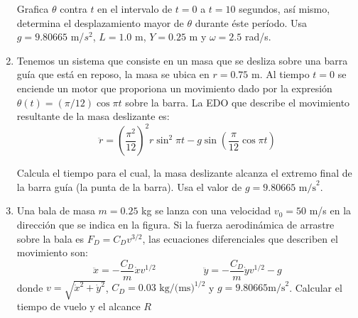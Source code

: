 \documentclass[11pt]{article}
\begin{document}
\begin{enumerate}
\begin{center}
\end{center}
Grafica $\theta$ contra $t$ en el intervalo de $t=0$ a $t=10$ segundos, as\'{i} mismo, determina el desplazamiento mayor de $\theta$ durante \'{e}ste per\'{i}odo. Usa $g=9.80665$ m/$s^{2}$, $L=1.0$ m, $Y=0.25$ m y $\omega = 2.5$ rad/s.
\item Tenemos un sistema que consiste en un masa que se desliza sobre una barra gu\'{i}a que est\'{a} en reposo, la masa se ubica en $r=0.75$ m. Al tiempo $t=0$ se enciende un motor que proporiona un movimiento dado por la expresi\'{o}n $\theta(t) = (\pi/12) \cos \pi t$ sobre la barra. La EDO que describe el movimiento resultante de la masa deslizante es:
\[ \ddot{r} = \left( \dfrac{\pi^{2}}{12}\right)^{2}  r \sin^{2} \pi t - g \sin \left( \dfrac{\pi}{12} \cos \pi t \right) \]
\begin{center}
\end{center}
Calcula el tiempo para el cual, la masa deslizante alcanza el extremo final de la barra gu\'{i}a (la punta de la barra). Usa el valor de $g=9.80665 \mbox{ m/s}^{2}$.
\item Una bala de masa $m=0.25$ kg se lanza con una velocidad $v_{0}= 50$ m/s en la direcci\'{o}n que se indica en la figura. Si la fuerza aerodin\'{a}mica de arrastre sobre la bala es $F_{D}= C_{D} v^{3/2}$, las ecuaciones diferenciales que describen el movimiento son:
\[\ddot{x} = - \dfrac{C_{D}}{m} \dot{x} v^{1/2} \hspace{2cm} \ddot{y}= - \dfrac{C_{D}}{m} \dot{y} v^{1/2} - g\]
donde $v=\sqrt{\dot{x}^{2} + \dot{y}^{2}}$, $C_{D} = 0.03 \mbox{ kg/(ms)}^{1/2}$ y $g=9.80665 \mbox{m/s}^{2}$. Calcular el tiempo de vuelo y el alcance $R$

\end{enumerate}
\end{document}
